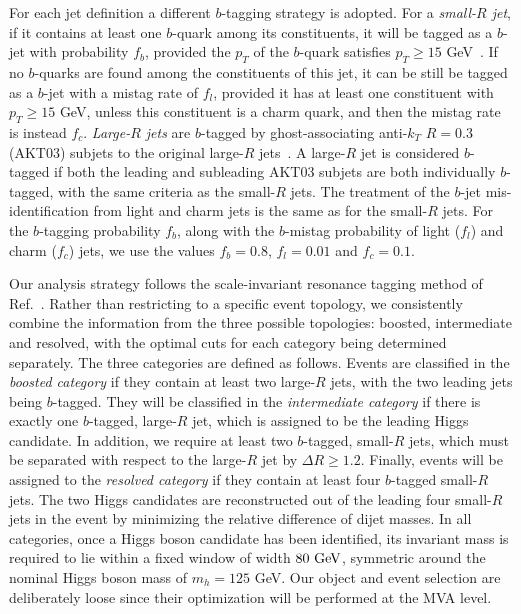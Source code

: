 \documentclass[a4paper,10pt]{article}
\begin{document}
For each jet definition a different
$b$-tagging strategy is adopted.
%
For a {\it small-$R$ jet}, if it contains at least one $b$-quark among its constituents,
it will be tagged as a $b$-jet with probability $f_b$, provided
the $p_T$ of the $b$-quark
  satisfies $p_T \ge 15$ GeV~\cite{Aad:2015ydr}.
  If no $b$-quarks are found among the constituents
  of this jet, it can be still be tagged as a $b$-jet with
  a mistag rate of $f_l$, provided it has at least one
  constituent
  with $p_T \ge 15$ GeV, unless this constituent
  is a charm quark, and then the mistag rate is instead $f_c$.
 {\it Large-$R$ jets} are $b$-tagged by
    ghost-associating anti-$k_T$ $R=0.3$ (AKT03)
    subjets to the original large-$R$
    jets~\cite{Cacciari:2007fd,Aad:2013gja,
      ATLAS-CONF-2014-004,Aad:2015uka}.
    A large-$R$ jet is considered $b$-tagged if both
    the leading and subleading AKT03 subjets are both individually $b$-tagged,
    with the same criteria as the small-$R$ jets.
     The treatment of the $b$-jet mis-identification
    from light and charm jets
    is the same as for the small-$R$ jets.
For the $b$-tagging probability $f_b$, along with
the $b$-mistag probability of light ($f_l$) and charm ($f_c$) jets,
we use the values $f_b=0.8$, $f_l=0.01$
and  $f_c=0.1$.



Our analysis strategy follows the
scale-invariant resonance tagging method of Ref.~\cite{Gouzevitch:2013qca}.
%
Rather than restricting to a specific event topology,
we consistently combine the information from
the three possible topologies: boosted, intermediate and
resolved, with the optimal cuts for each category being determined
separately.
%
The three categories are defined as follows.
%
Events are classified in the {\it boosted category} if they 
  contain at least two large-$R$ jets, with the two leading jets
  being $b$-tagged.
  They will be classified in the
 {\it intermediate category} if there is exactly one  $b$-tagged, large-$R$ jet, which
  is assigned to be the leading Higgs candidate.
  In addition, we require at least two $b$-tagged, small-$R$ jets,
  which must be separated with respect to the large-$R$ jet
  by  $\Delta R\ge 1.2$.
  Finally, events will be assigned to the {\it resolved category}
  if they contain at least
  four $b$-tagged small-$R$ jets.
  The two Higgs candidates are reconstructed out of the
  leading four small-$R$ jets in the event by minimizing the relative difference of
  dijet masses.
  In all categories, once a Higgs boson candidate has been identified,
its invariant mass is required to lie within a fixed window
of width $80~{\rm GeV}$,
symmetric around the nominal Higgs boson mass of $m_h= 125$
GeV.
%
 Our object and event selection are deliberately loose since their optimization will be
  performed at the MVA level.
\end{document}

